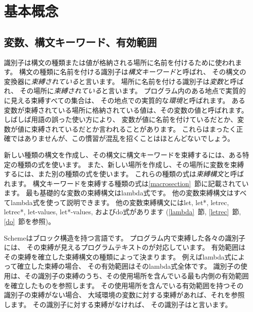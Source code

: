 \chapter{基本概念}
\label{basicchapter}

\section{変数、構文キーワード、有効範囲}
\label{specialformsection}
\label{variablesection}

識別子は構文の種類または値が格納される場所に名前を付けるために使われます。
構文の種類に名前を付ける識別子は{\em 構文キーワード}と呼ばれ、
その構文の変換器に{\em 束縛されている}と言います。
場所に名前を付ける識別子は{\em 変数}と呼ばれ、
その場所に{\em 束縛されている}と言います。
プログラム内のある地点で実質的に見える束縛すべての集合は、
その地点での実質的な{\em 環境}と呼ばれます。
ある変数が束縛されている場所に格納されている値は、その変数の値と呼ばれます。
しばしば用語の誤った使い方により、
変数が値に名前を付けているだとか、変数が値に束縛されているだとか言われることがあります。
これらはまったく正確ではありませんが、この慣習が混乱を招くことはほとんどないでしょう。

\vest 新しい種類の構文を作成し、その構文に構文キーワードを束縛するには、ある特定の種類の式を使います。
また、新しい場所を作成し、その場所に変数を束縛するには、また別の種類の式を使います。
これらの種類の式は{\em 束縛構文}と呼ばれます。
構文キーワードを束縛する種類の式は\ref{macrosection}~節に記載されています。
最も基礎的な変数の束縛構文は{\cf lambda}式です。
他の変数束縛構文はすべて{\cf lambda}式を使って説明できます。
他の変数束縛構文には{\cf let}, {\cf let*}, {\cf letrec},
{\cf letrec*}, {\cf let-values}, {\cf let*-values},
および{\cf do}式があります
(\ref{lambda}~節, \ref{letrec}~節, \ref{do}~節を参照)。


\vest Schemeはブロック構造を持つ言語です。
プログラム内で束縛した各々の識別子には、
その束縛が見えるプログラムテキストのが対応しています。
有効範囲はその束縛を確立した束縛構文の種類によって決まります。
例えば{\cf lambda}式によって確立した束縛の場合、
その有効範囲はその{\cf lambda}式全体です。
識別子の使用は、その識別子の束縛のうち、その使用場所を含んでいる最も内側の有効範囲を確立したものを参照します。
その使用場所を含んでいる有効範囲を持つその識別子の束縛がない場合、
大域環境の変数に対する束縛があれば、それを参照します。
その識別子に対する束縛がなければ、
その識別子はと言います。

